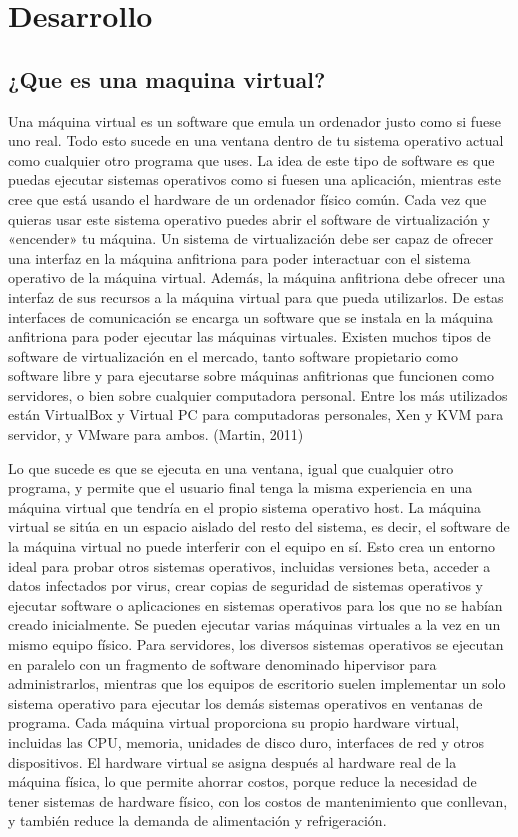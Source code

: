 \documentclass[twoside,twocolumn]{article}
\begin{document}
\section{Desarrollo}

\subsection{¿Que es una maquina virtual?}

Una máquina virtual es un software que emula un ordenador justo como si fuese uno real. Todo esto sucede en una ventana dentro de tu sistema operativo actual como cualquier otro programa que uses. La idea de este tipo de software es que puedas ejecutar sistemas operativos como si fuesen una aplicación, mientras este cree que está usando el hardware de un ordenador físico común. Cada vez que quieras usar este sistema operativo puedes abrir el software de virtualización y «encender» tu máquina.
Un sistema de virtualización debe ser capaz de ofrecer una interfaz en la máquina anfitriona para poder interactuar con el sistema operativo de la máquina virtual. Además, la máquina anfitriona debe ofrecer una interfaz de sus recursos a la máquina virtual para que pueda utilizarlos. De estas interfaces de comunicación se encarga un software que se instala en la máquina anfitriona para poder ejecutar las máquinas virtuales. Existen muchos tipos de software de virtualización en el mercado, tanto software propietario como software libre y para ejecutarse sobre máquinas anfitrionas que funcionen como servidores, o bien sobre cualquier computadora personal. Entre los más utilizados están VirtualBox y Virtual PC para computadoras personales, Xen y KVM para servidor, y VMware para ambos. (Martin, 2011)

Lo que sucede es que se ejecuta en una ventana, igual que cualquier otro programa, y permite que el usuario final tenga la misma experiencia en una máquina virtual que tendría en el propio sistema operativo host. La máquina virtual se sitúa en un espacio aislado del resto del sistema, es decir, el software de la máquina virtual no puede interferir con el equipo en sí. Esto crea un entorno ideal para probar otros sistemas operativos, incluidas versiones beta, acceder a datos infectados por virus, crear copias de seguridad de sistemas operativos y ejecutar software o aplicaciones en sistemas operativos para los que no se habían creado inicialmente.
Se pueden ejecutar varias máquinas virtuales a la vez en un mismo equipo físico. Para servidores, los diversos sistemas operativos se ejecutan en paralelo con un fragmento de software denominado hipervisor para administrarlos, mientras que los equipos de escritorio suelen implementar un solo sistema operativo para ejecutar los demás sistemas operativos en ventanas de programa. Cada máquina virtual proporciona su propio hardware virtual, incluidas las CPU, memoria, unidades de disco duro, interfaces de red y otros dispositivos. El hardware virtual se asigna después al hardware real de la máquina física, lo que permite ahorrar costos, porque reduce la necesidad de tener sistemas de hardware físico, con los costos de mantenimiento que conllevan, y también reduce la demanda de alimentación y refrigeración.
\end{document}
